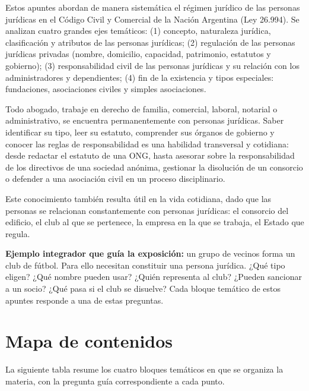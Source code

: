 \documentclass[12pt,oneside]{book}
\begin{document}
Estos apuntes abordan de manera sistemática el régimen jurídico de las personas jurídicas en el Código Civil y Comercial de la Nación Argentina (Ley 26.994). Se analizan cuatro grandes ejes temáticos: (1) concepto, naturaleza jurídica, clasificación y atributos de las personas jurídicas; (2) regulación de las personas jurídicas privadas (nombre, domicilio, capacidad, patrimonio, estatutos y gobierno); (3) responsabilidad civil de las personas jurídicas y su relación con los administradores y dependientes; (4) fin de la existencia y tipos especiales: fundaciones, asociaciones civiles y simples asociaciones.

\begin{note}
Todo abogado, trabaje en derecho de familia, comercial, laboral, notarial o administrativo, se encuentra permanentemente con personas jurídicas. Saber identificar su tipo, leer su estatuto, comprender sus órganos de gobierno y conocer las reglas de responsabilidad es una habilidad transversal y cotidiana: desde redactar el estatuto de una ONG, hasta asesorar sobre la responsabilidad de los directivos de una sociedad anónima, gestionar la disolución de un consorcio o defender a una asociación civil en un proceso disciplinario.

Este conocimiento también resulta útil en la vida cotidiana, dado que las personas se relacionan constantemente con personas jurídicas: el consorcio del edificio, el club al que se pertenece, la empresa en la que se trabaja, el Estado que regula.
\end{note}

\textbf{Ejemplo integrador que guía la exposición:} un grupo de vecinos forma un club de fútbol. Para ello necesitan constituir una persona jurídica. ¿Qué tipo eligen? ¿Qué nombre pueden usar? ¿Quién representa al club? ¿Pueden sancionar a un socio? ¿Qué pasa si el club se disuelve? Cada bloque temático de estos apuntes responde a una de estas preguntas.

\section*{Mapa de contenidos}

La siguiente tabla resume los cuatro bloques temáticos en que se organiza la materia, con la pregunta guía correspondiente a cada punto.
\end{document}

